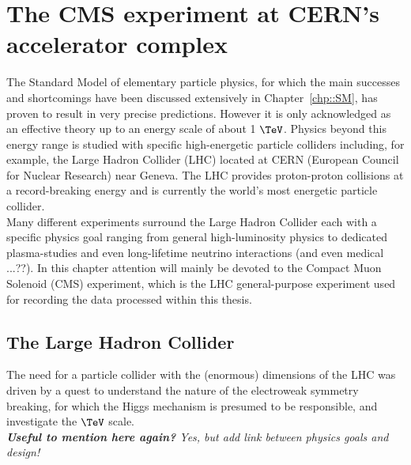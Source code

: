 \chapter{The CMS experiment at CERN's accelerator complex} \label{chp:CERN}

The Standard Model of elementary particle physics, for which the main successes and shortcomings have been discussed extensively in Chapter~\ref{chp::SM}, has proven to result in very precise predictions. However it is only acknowledged as an effective theory up to an energy scale of about 1 $\TeV$. Physics beyond this energy range is studied with specific high-energetic particle colliders including, for example, the Large Hadron Collider (LHC) located at CERN (European Council for Nuclear Research) near Geneva. The LHC provides proton-proton collisions at a record-breaking energy and is currently the world's most energetic particle collider.\\
Many different experiments surround the Large Hadron Collider each with a specific physics goal ranging from general high-luminosity physics to dedicated plasma-studies and even long-lifetime neutrino interactions (and even medical ...??).
In this chapter attention will mainly be devoted to the Compact Muon Solenoid (CMS) experiment, which is the LHC general-purpose experiment used for recording the data processed within this thesis.

\section{The Large Hadron Collider}
The need for a particle collider with the (enormous) dimensions of the LHC was driven by a quest to understand the nature of the electroweak symmetry breaking, for which the Higgs mechanism is presumed to be responsible, and investigate the $\TeV$ scale.
\\
\textit{\textbf{Useful to mention here again?} Yes, but add link between physics goals and design!}
\\


